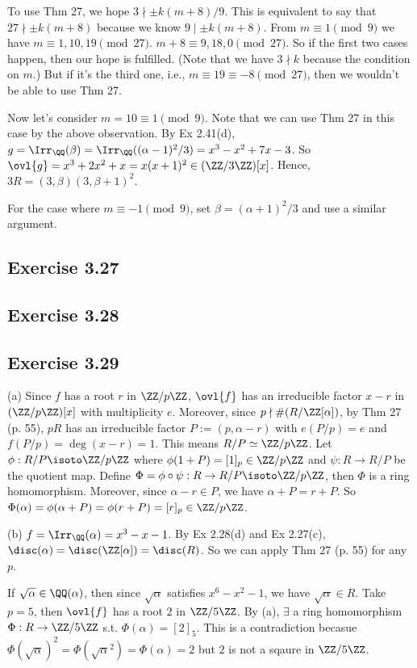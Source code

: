 \documentclass[../Chapter.tex]{subfiles}
\begin{document}
To use Thm 27, we hope $3\nmid \pm k(m+8)/9$. This is equivalent to say that $27\nmid \pm k(m+8)$ because we know $9\mid \pm k(m+8)$. From $m\equiv 1 \pmod{9}$ we have $m\equiv 1,10,19 \pmod{27}$. $m+8\equiv 9,18,0 \pmod{27}$. So if the first two cases happen, then our hope is fulfilled. (Note that we have $3\nmid k$ because the condition on $m$.) But if it's the third one, i.e., $m\equiv 19\equiv -8 \pmod{27}$, then we wouldn't be able to use Thm 27.

Now let's consider $m=10\equiv 1\pmod{9}$. Note that we can use Thm 27 in this case by the above observation. By Ex 2.41(d), $g=\Irr_\QQ(\beta)=\Irr_\QQ((\alpha-1)^2/3)=x^3-x^2+7x-3$. So $\ovl{g}=x^3+2x^2+x=x(x+1)^2\in(\ZZ/3\ZZ)[x]$. Hence, $3R=(3,\beta)(3,\beta+1)^2$.

For the case where $m\equiv -1\pmod{9}$, set $\beta=(\alpha+1)^2/3$ and use a similar argument.

\subsection*{Exercise 3.27}

\subsection*{Exercise 3.28}

\subsection*{Exercise 3.29}

(a) Since $f$ has a root $r$ in $\ZZ/p\ZZ$, $\ovl{f}$ has an irreducible factor $x-r$ in $(\ZZ/p\ZZ)[x]$ with multiplicity $e$. Moreover, since $p\nmid \#(R/\ZZ[\alpha])$, by Thm 27 (p. 55), $pR$ has an irreducible factor $P:=(p,\alpha-r)$ with $e(P/p)=e$ and $f(P/p)=\deg(x-r)=1$. This means $R/P\simeq \ZZ/p\ZZ$. Let $\phi:R/P\isoto\ZZ/p\ZZ$ where $\phi(1+P)=[1]_p\in\ZZ/p\ZZ$ and $\psi:R\to R/P$ be the quotient map. Define $\Phi=\phi\circ\psi:R\to R/P\isoto\ZZ/p\ZZ$, then $\Phi$ is a ring homomorphism. Moreover, since $\alpha-r\in P$, we have $\alpha+P=r+P$. So $\Phi(\alpha)=\phi(\alpha+P)=\phi(r+P)=[r]_p\in\ZZ/p\ZZ$.

(b) $f=\Irr_\QQ(\alpha)=x^3-x-1$. By Ex 2.28(d) and Ex 2.27(c), $\disc(\alpha)=\disc(\ZZ[\alpha])=\disc(R)$. So we can apply Thm 27 (p. 55) for any $p$.

If $\sqrt{\alpha}\in\QQ(\alpha)$, then since $\sqrt{\alpha}$ satisfies $x^6-x^2-1$, we have $\sqrt{\alpha}\in R$. Take $p=5$, then $\ovl{f}$ has a root $2$ in $\ZZ/5\ZZ$. By (a), $\exists$ a ring homomorphism $\Phi:R\to\ZZ/5\ZZ$ s.t. $\Phi(\alpha)=[2]_5$. This is a contradiction becasue $\Phi(\sqrt{\alpha})^2=\Phi(\sqrt{\alpha}^2)=\Phi(\alpha)=2$ but $2$ is not a sqaure in $\ZZ/5\ZZ$.
\end{document}
